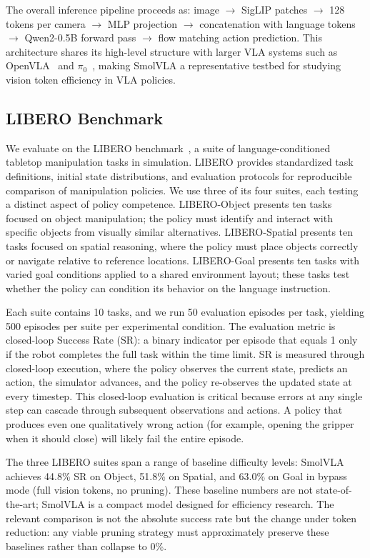 The overall inference pipeline proceeds as: image $\rightarrow$ SigLIP patches $\rightarrow$ 128 tokens per camera $\rightarrow$ MLP projection $\rightarrow$ concatenation with language tokens $\rightarrow$ Qwen2-0.5B forward pass $\rightarrow$ flow matching action prediction.
This architecture shares its high-level structure with larger VLA systems such as OpenVLA~\cite{kim2024openvla} and $\pi_0$~\cite{black2024pi0}, making SmolVLA a representative testbed for studying vision token efficiency in VLA policies.

\subsection{LIBERO Benchmark}
\label{sec:libero_bench}

We evaluate on the LIBERO benchmark~\cite{liu2023libero}, a suite of language-conditioned tabletop manipulation tasks in simulation.
LIBERO provides standardized task definitions, initial state distributions, and evaluation protocols for reproducible comparison of manipulation policies.
We use three of its four suites, each testing a distinct aspect of policy competence.
LIBERO-Object presents ten tasks focused on object manipulation; the policy must identify and interact with specific objects from visually similar alternatives.
LIBERO-Spatial presents ten tasks focused on spatial reasoning, where the policy must place objects correctly or navigate relative to reference locations.
LIBERO-Goal presents ten tasks with varied goal conditions applied to a shared environment layout; these tasks test whether the policy can condition its behavior on the language instruction.

Each suite contains 10 tasks, and we run 50 evaluation episodes per task, yielding 500 episodes per suite per experimental condition.
The evaluation metric is closed-loop Success Rate (SR): a binary indicator per episode that equals 1 only if the robot completes the full task within the time limit.
SR is measured through closed-loop execution, where the policy observes the current state, predicts an action, the simulator advances, and the policy re-observes the updated state at every timestep.
This closed-loop evaluation is critical because errors at any single step can cascade through subsequent observations and actions.
A policy that produces even one qualitatively wrong action (for example, opening the gripper when it should close) will likely fail the entire episode.

The three LIBERO suites span a range of baseline difficulty levels: SmolVLA achieves 44.8\% SR on Object, 51.8\% on Spatial, and 63.0\% on Goal in bypass mode (full vision tokens, no pruning).
These baseline numbers are not state-of-the-art; SmolVLA is a compact model designed for efficiency research.
The relevant comparison is not the absolute success rate but the change under token reduction: any viable pruning strategy must approximately preserve these baselines rather than collapse to 0\%.
